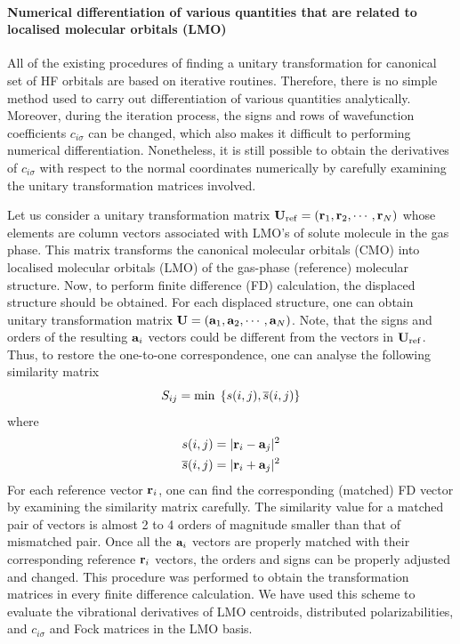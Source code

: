 \documentclass[a4paper,titlepage,twoside,fleqn,12pt]{book}
\begin{document}
\begin{appendices}
\begin{refsection}
\paragraph{Numerical differentiation of various quantities that are related to localised
molecular orbitals (LMO)}

All of the existing procedures of finding a unitary transformation for canonical set of HF
orbitals are based on iterative routines. Therefore, there is no simple method used to carry out
differentiation of various quantities analytically. Moreover, during the iteration process, the
signs and rows of wavefunction coefficients $c_{i\sigma}$ can be changed, which also makes it difficult
to performing numerical differentiation. Nonetheless, it is still possible to obtain the
derivatives of $c_{i\sigma}$ with respect to the normal coordinates numerically by carefully examining
the unitary transformation matrices involved.

Let us consider a unitary transformation matrix 
${\bf U}_{\rm ref}=\left({\bf r}_1, {\bf r}_2, \cdots, {\bf r}_N\right)$ whose elements
are column vectors associated with LMO's of solute molecule in the gas phase. This matrix
transforms the canonical molecular orbitals (CMO) into localised molecular orbitals (LMO)
of the gas\hyp{}phase (reference) molecular structure. Now, to perform finite difference (FD)
calculation, the displaced structure should be obtained. For each displaced structure, one can
obtain unitary transformation matrix ${\bf U}=\left({\bf a}_1, {\bf a}_2, \cdots, {\bf a}_N\right)$.
Note, that the signs and orders of
the resulting ${\bf a}_i$ vectors could be different from the vectors in ${\bf U}_{\rm ref}$. 
Thus, to restore the one\hyp{}to\hyp{}one
correspondence, one can analyse the following similarity matrix
%
\begin{equation}  \label{e:smin-lmo}
S_{ij} = {\rm min}\;\left\{ s(i,j), \overline{s}(i,j)\right\}
\end{equation}
%
where
%
\begin{subequations}  
\begin{align}
 s(i,j)            &= \lvert {\bf r}_i - {\bf a}_j\rvert^2\\
 \overline{s}(i,j) &= \lvert {\bf r}_i + {\bf a}_j\rvert^2
\end{align}
\end{subequations}
%
For each reference vector ${\bf r}_i$, one can find the corresponding (matched) FD vector by
examining the similarity matrix carefully. The similarity value for a matched pair of vectors is
almost 2 to 4 orders of magnitude smaller than that of mismatched pair. Once all the ${\bf a}_i$ vectors
are properly matched with their corresponding reference ${\bf r}_i$ vectors, the orders and signs can
be properly adjusted and changed. This procedure was performed to obtain the transformation
matrices in every finite difference calculation. We have used this scheme to evaluate the
vibrational derivatives of LMO centroids, distributed polarizabilities, and $c_{i\sigma}$ and Fock
matrices in the LMO basis.



\end{refsection}
\end{appendices}
\end{document}
